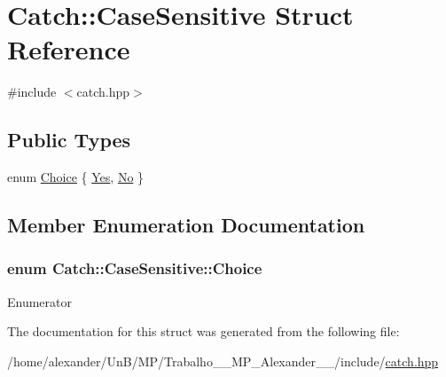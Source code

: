 \hypertarget{structCatch_1_1CaseSensitive}{\section{Catch\-:\-:Case\-Sensitive Struct Reference}
\label{structCatch_1_1CaseSensitive}
}


{\ttfamily \#include $<$catch.\-hpp$>$}

\subsection*{Public Types}
\begin{DoxyCompactItemize}
\item 
enum \hyperlink{structCatch_1_1CaseSensitive_aad49d3aee2d97066642fffa919685c6a}{Choice} \{ \hyperlink{structCatch_1_1CaseSensitive_aad49d3aee2d97066642fffa919685c6aa7c5550b69ec3c502e6f609b67f9613c6}{Yes}, 
\hyperlink{structCatch_1_1CaseSensitive_aad49d3aee2d97066642fffa919685c6aa4ffff8d29b481f0116abc37228cd53f6}{No}
 \}
\end{DoxyCompactItemize}


\subsection{Member Enumeration Documentation}
\hypertarget{structCatch_1_1CaseSensitive_aad49d3aee2d97066642fffa919685c6a}{
\subsubsection[{Choice}]{\setlength{\rightskip}{0pt plus 5cm}enum {\bf Catch\-::\-Case\-Sensitive\-::\-Choice}}}\label{structCatch_1_1CaseSensitive_aad49d3aee2d97066642fffa919685c6a}
\begin{Desc}
\item[Enumerator]\par
\begin{description}
\item[{\em 
\hypertarget{structCatch_1_1CaseSensitive_aad49d3aee2d97066642fffa919685c6aa7c5550b69ec3c502e6f609b67f9613c6}{Yes}\label{structCatch_1_1CaseSensitive_aad49d3aee2d97066642fffa919685c6aa7c5550b69ec3c502e6f609b67f9613c6}
}]\item[{\em 
\hypertarget{structCatch_1_1CaseSensitive_aad49d3aee2d97066642fffa919685c6aa4ffff8d29b481f0116abc37228cd53f6}{No}\label{structCatch_1_1CaseSensitive_aad49d3aee2d97066642fffa919685c6aa4ffff8d29b481f0116abc37228cd53f6}
}]\end{description}
\end{Desc}


The documentation for this struct was generated from the following file\-:\begin{DoxyCompactItemize}
\item 
/home/alexander/\-Un\-B/\-M\-P/\-Trabalho\-\_\-\_\-\-M\-P\-\_\-\-Alexander\-\_\-\_/include/\hyperlink{catch_8hpp}{catch.\-hpp}\end{DoxyCompactItemize}
